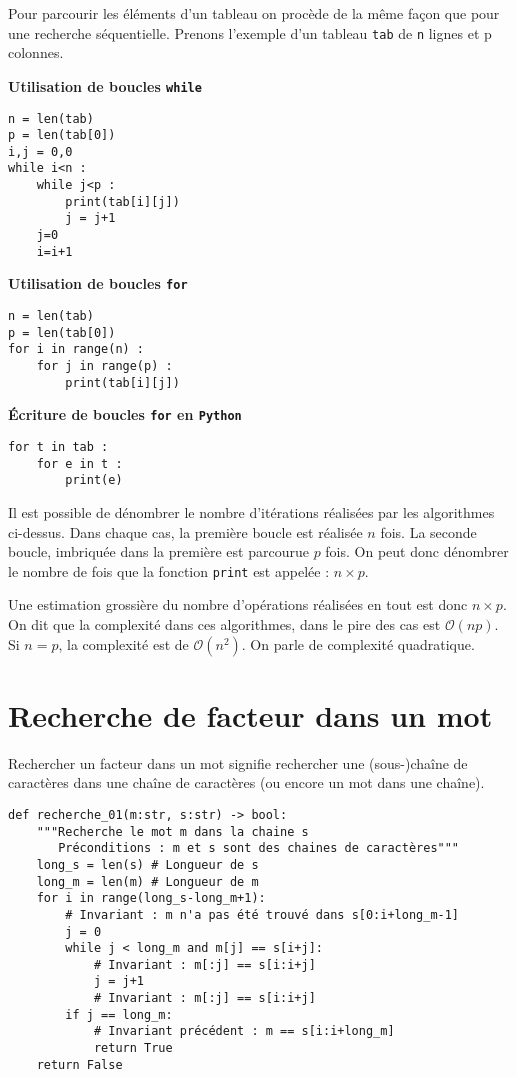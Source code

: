 \documentclass[t,10pt]{article}
\begin{document}
Pour parcourir les éléments d'un tableau on procède de la même façon que pour une recherche séquentielle. Prenons l'exemple d'un tableau \texttt{tab} de \texttt{n} lignes et {p} colonnes.

\textbf{Utilisation de boucles \texttt{while}}
\begin{lstlisting}
n = len(tab)
p = len(tab[0])
i,j = 0,0
while i<n :
    while j<p :
        print(tab[i][j])
        j = j+1
    j=0
    i=i+1
\end{lstlisting}

\textbf{Utilisation de boucles \texttt{for}}
\begin{lstlisting}
n = len(tab)
p = len(tab[0])
for i in range(n) :
    for j in range(p) :
        print(tab[i][j])
\end{lstlisting}

\textbf{Écriture de boucles \texttt{for} en \texttt{Python}}
\begin{lstlisting}
for t in tab :
    for e in t :
        print(e)
\end{lstlisting}

\begin{rem}
Il est possible de dénombrer le nombre d'itérations réalisées par les algorithmes ci-dessus. Dans chaque cas, la première boucle est réalisée $n$ fois. La seconde boucle, imbriquée dans la première est parcourue $p$ fois. 
On peut donc dénombrer le nombre de fois que la fonction \texttt{print} est appelée : $n\times p$. 

Une estimation grossière du nombre d'opérations réalisées en tout est donc  $n\times p$. On dit que la complexité dans ces algorithmes, dans le pire des cas est $\mathcal{O}\left(np\right)$. Si $n=p$, la complexité est de $\mathcal{O}\left(n^2\right)$. On parle de complexité quadratique. 

\end{rem}
 

\section{Recherche de facteur dans un mot}
Rechercher un facteur dans un mot signifie rechercher une (sous-)chaîne de caractères dans une chaîne de caractères (ou encore un mot dans une chaîne).
\begin{lstlisting}
def recherche_01(m:str, s:str) -> bool:
    """Recherche le mot m dans la chaine s
       Préconditions : m et s sont des chaines de caractères"""
    long_s = len(s) # Longueur de s
    long_m = len(m) # Longueur de m
    for i in range(long_s-long_m+1): 
        # Invariant : m n'a pas été trouvé dans s[0:i+long_m-1]
        j = 0
        while j < long_m and m[j] == s[i+j]:
            # Invariant : m[:j] == s[i:i+j]
            j = j+1
            # Invariant : m[:j] == s[i:i+j]
        if j == long_m:
            # Invariant précédent : m == s[i:i+long_m]
            return True
    return False
\end{lstlisting}
\end{document}

